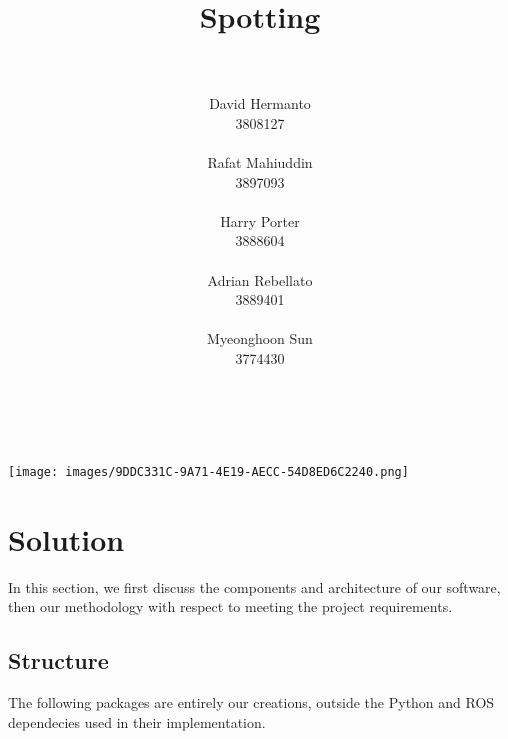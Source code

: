 \documentclass[10pt,english]{article}
\title{\huge{\textbf{Spotting}}}
\author{
    \\\\
    David Hermanto\\
    \small 3808127\\
    \\
    Rafat Mahiuddin\\
    \small 3897093\\
    \\
    Harry Porter\\
    \small 3888604\\
    \\
    Adrian Rebellato\\
    \small 3889401\\
    \\
    Myeonghoon Sun\\
    \small 3774430\\
    \\\\
}
\date{}
\begin{document}
\maketitle
\thispagestyle{empty}
\clearpage

\vspace*{\fill}
\begin{center}
\texttt{[image: images/9DDC331C-9A71-4E19-AECC-54D8ED6C2240.png]}
\end{center}
\vfill
\thispagestyle{empty}

\clearpage


\section*{Solution}

In this section, we first discuss the components and architecture of our software, then our methodology with respect to meeting the project requirements.


\subsection*{Structure}


The following packages are entirely our creations, outside the Python and ROS dependecies used in their implementation.
\end{document}
